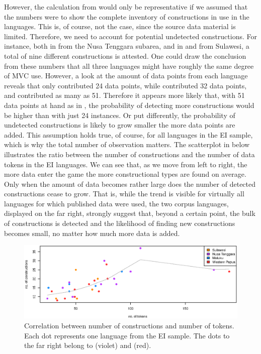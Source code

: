 \largerpage[-1]
However, the calculation from  would only be representative if we assumed that the numbers were to show the complete inventory of constructions in use in the languages. This is, of course, not the case, since the source data material is limited. Therefore, we need to account for potential undetected constructions. For instance, both in  from the Nusa Tenggara subarea, and in  and  from Sulawesi, a total of nine different constructions is attested. One could draw the conclusion from these numbers that all three languages might have roughly the same degree of MVC use. However, a look at the amount of data points from each language reveals that  only contributed 24 data points, while  contributed 32 data points, and  contributed as many as 51. Therefore it appears more likely that, with 51 data points at hand as in , the probability of detecting more constructions would be higher than with just 24 instances. Or put differently, the probability of undetected constructions is likely to grow smaller the more data points are added. This assumption holds true, of course, for all languages in the EI sample, which is why the total number of observation matters. The scatterplot in  below illustrates the ratio between the number of constructions and the number of data tokens in the EI languages. We can see that, as we move from left to right, the more data enter the game the more constructional types are found on average. Only when the amount of data becomes rather large does the number of detected constructions cease to grow. That is, while the trend is visible for virtually all languages for which published data were used, the two corpus languages, displayed on the far right, strongly suggest that, beyond a certain point, the bulk of constructions is detected and the likelihood of finding new constructions becomes small, no matter how much more data is added.

\begin{figure}
\includegraphics[width=\linewidth]{figures/constructions_tokens_clean.eps}
\caption[Correlation between number of constructions and number of tokens]{Correlation between number of constructions and number of tokens. Each dot represents one language from the EI sample. The dots to the far right belong to  (violet) and  (red).}\label{fig:constructions_tokens}
\end{figure}

